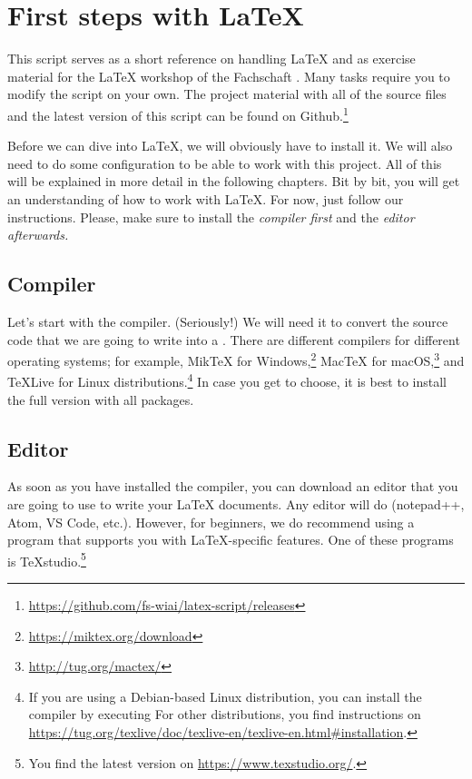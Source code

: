 \newpage
{}
\pagecolor{latexblue}

\chapter*{First steps with \LaTeX}

This script serves as a short reference on handling \LaTeX{} and as exercise material for the \LaTeX{} workshop of the Fachschaft .
Many tasks require you to modify the script on your own.
The project material with all of the source files and the latest version of this script can be found on Github.\footnote{\url{https://github.com/fs-wiai/latex-script/releases}}

Before we can dive into \LaTeX{}, we will obviously have to install it.
We will also need to do some configuration to be able to work with this project.
All of this will be explained in more detail in the following chapters.
Bit by bit, you will get an understanding of how to work with \LaTeX{}.
For now, just follow our instructions.
Please, make sure to install the \emph{compiler first} and the \emph{editor afterwards}\textit{.}

\section*{Compiler}
Let’s start with the compiler.
(Seriously!)
We will need it to convert the source code that we are going to write into a .
There are different compilers for different operating systems;
for example, MikTeX for Windows,\footnote{\url{https://miktex.org/download}} Mac\TeX{} for macOS,\footnote{\url{http://tug.org/mactex/}} and \TeX{}Live for Linux distributions.\footnote{If you are using a Debian-based Linux distribution, you can install the compiler by executing 
For other distributions, you find instructions on \url{https://tug.org/texlive/doc/texlive-en/texlive-en.html\#installation}.}
In case you get to choose, it is best to install the full version with all packages.

\section*{Editor}
As soon as you have installed the compiler, you can download an editor that you are going to use to write your \LaTeX{} documents.
Any editor will do (notepad++, Atom, VS Code, etc.).
However, for beginners, we do recommend using a program that supports you with \LaTeX-specific features.
One of these programs is \TeX{}studio.\footnote{You find the latest version on \url{https://www.texstudio.org/}.}

